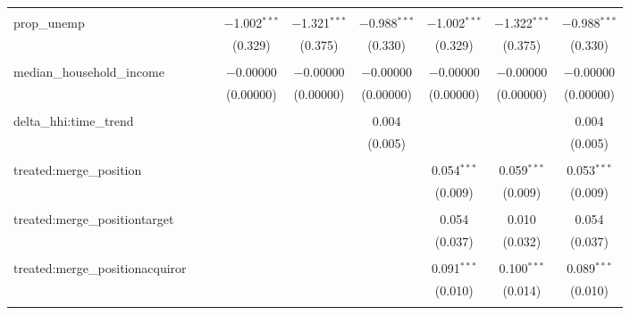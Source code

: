 \begin{table}[H]
{\begin{tabular}{@{\extracolsep{5pt}}lcccccccc}
   & & & & & & & & \\  

  prop\_unemp &  &  & $-$1.002$^{***}$ & $-$1.321$^{***}$ & $-$0.988$^{***}$ & $-$1.002$^{***}$ & $-$1.322$^{***}$ & $-$0.988$^{***}$ \\  

   &  &  & (0.329) & (0.375) & (0.330) & (0.329) & (0.375) & (0.330) \\  

   & & & & & & & & \\  

  median\_household\_income &  &  & $-$0.00000 & $-$0.00000 & $-$0.00000 & $-$0.00000 & $-$0.00000 & $-$0.00000 \\  

   &  &  & (0.00000) & (0.00000) & (0.00000) & (0.00000) & (0.00000) & (0.00000) \\  

   & & & & & & & & \\  

  delta\_hhi:time\_trend &  &  &  &  & 0.004 &  &  & 0.004 \\  

   &  &  &  &  & (0.005) &  &  & (0.005) \\  

   & & & & & & & & \\  

  treated:merge\_position &  &  &  &  &  & 0.054$^{***}$ & 0.059$^{***}$ & 0.053$^{***}$ \\  

   &  &  &  &  &  & (0.009) & (0.009) & (0.009) \\  

   & & & & & & & & \\  

  treated:merge\_positiontarget &  &  &  &  &  & 0.054 & 0.010 & 0.054 \\  

   &  &  &  &  &  & (0.037) & (0.032) & (0.037) \\  

   & & & & & & & & \\  

  treated:merge\_positionacquiror &  &  &  &  &  & 0.091$^{***}$ & 0.100$^{***}$ & 0.089$^{***}$ \\  

   &  &  &  &  &  & (0.010) & (0.014) & (0.010) \\  

   & & & & & & & & \\  


\end{tabular}}
\end{table}
